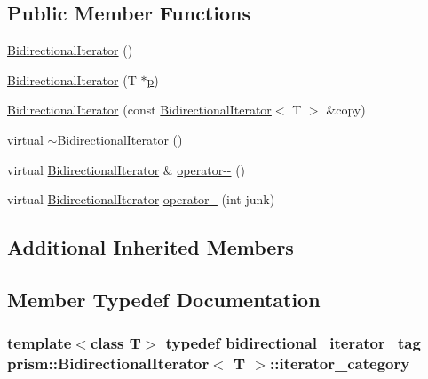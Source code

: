 \subsection*{Public Member Functions}
\begin{DoxyCompactItemize}
\item 
\hyperlink{classprism_1_1_bidirectional_iterator_a1d494640e51b72fee5dd601a722924a1}{Bidirectional\+Iterator} ()
\item 
\hyperlink{classprism_1_1_bidirectional_iterator_aad22e3ea552e27f9ccb82bcb4999575b}{Bidirectional\+Iterator} (T $\ast$\hyperlink{classprism_1_1_forward_iterator_a44e23472687df2dcf68780ba6173557a}{p})
\item 
\hyperlink{classprism_1_1_bidirectional_iterator_aaa3bb795687f32d6db825f08659669be}{Bidirectional\+Iterator} (const \hyperlink{classprism_1_1_bidirectional_iterator}{Bidirectional\+Iterator}$<$ T $>$ \&copy)
\item 
virtual \hyperlink{classprism_1_1_bidirectional_iterator_a949f84e373e2631cc694ebc5d81423f9}{$\sim$\+Bidirectional\+Iterator} ()
\item 
virtual \hyperlink{classprism_1_1_bidirectional_iterator}{Bidirectional\+Iterator} \& \hyperlink{classprism_1_1_bidirectional_iterator_a71598fbf44926424c189553b0f756b57}{operator-\/-\/} ()
\item 
virtual \hyperlink{classprism_1_1_bidirectional_iterator}{Bidirectional\+Iterator} \hyperlink{classprism_1_1_bidirectional_iterator_a4484088181be6f02cbc60c165db3189c}{operator-\/-\/} (int junk)
\end{DoxyCompactItemize}
\subsection*{Additional Inherited Members}


\subsection{Member Typedef Documentation}
\subsubsection[{\texorpdfstring{iterator\+\_\+category}{iterator_category}}]{\setlength{\rightskip}{0pt plus 5cm}template$<$class T$>$ typedef {\bf bidirectional\+\_\+iterator\+\_\+tag} {\bf prism\+::\+Bidirectional\+Iterator}$<$ T $>$\+::{\bf iterator\+\_\+category}}\hypertarget{classprism_1_1_bidirectional_iterator_a88ba2497fb00dd276b2cfb799cb61bc2}{}\label{classprism_1_1_bidirectional_iterator_a88ba2497fb00dd276b2cfb799cb61bc2}


